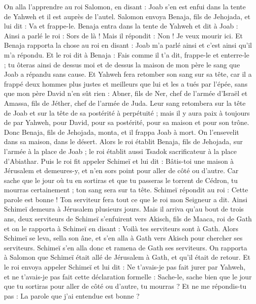 \begin{multicols}{2}
On alla l’apprendre au roi Salomon, en disant : Joab s'en est enfui dans la tente de Yahweh et il est auprès de l'autel. Salomon envoya Benaja, fils de Jehojada, et lui dit : Va et frappe-le.
Benaja entra dans la tente de Yahweh et dit à Joab : Ainsi a parlé le roi : Sors de là ! Mais il répondit : Non ! Je veux mourir ici. Et Benaja rapporta la chose au roi en disant : Joab m'a parlé ainsi et c’est ainsi qu’il m’a répondu.
Et le roi dit à Benaja : Fais comme il t'a dit, frappe-le et enterre-le ; tu ôteras ainsi de dessus moi et de dessus la maison de mon père le sang que Joab a répandu sans cause.
Et Yahweh fera retomber son sang sur sa tête, car il a frappé deux hommes plus justes et meilleurs que lui et les a tués par l'épée, sans que mon père David n’en sût rien : Abner, fils de Ner, chef de l'armée d'Israël et Amassa, fils de Jéther, chef de l'armée de Juda.
Leur sang retombera sur la tête de Joab et sur la tête de sa postérité à perpétuité ; mais il y aura paix à toujours de par Yahweh, pour David, pour sa postérité, pour sa maison et pour son trône.
Donc Benaja, fils de Jehojada, monta, et il frappa Joab à mort. On l'ensevelit dans sa maison, dans le désert.
Alors le roi établit Benaja, fils de Jehojada, sur l'armée à la place de Joab ; le roi établit aussi Tsadok sacrificateur à la place d'Abiathar.
Puis le roi fit appeler Schimeï et lui dit : Bâtis-toi une maison à Jérusalem et demeures-y, et n'en sors point pour aller de côté ou d'autre.
Car sache que le jour où tu en sortiras et que tu passeras le torrent de Cédron, tu mourras certainement ; ton sang sera sur ta tête.
Schimeï répondit au roi : Cette parole est bonne ! Ton serviteur fera tout ce que le roi mon Seigneur a dit. Ainsi Schimeï demeura à Jérusalem plusieurs jours.
Mais il arriva qu'au bout de trois ans, deux serviteurs de Schimeï s'enfuirent vers Akisch, fils de Maaca, roi de Gath et on le rapporta à Schimeï en disant : Voilà tes serviteurs sont à Gath.
Alors Schimeï se leva, sella son âne, et s'en alla à Gath vers Akisch pour chercher ses serviteurs. Schimeï s'en alla donc et ramena de Gath ses serviteurs.
On rapporta à Salomon que Schimeï était allé de Jérusalem à Gath, et qu'il était de retour.
Et le roi envoya appeler Schimeï et lui dit : Ne t'avais-je pas fait jurer par Yahweh, et ne t'avais-je pas fait cette déclaration formelle : Sache-le, sache bien que le jour que tu sortiras pour aller de côté ou d’autre, tu mourras ? Et ne me répondis-tu pas : La parole que j'ai entendue est bonne ?

\end{multicols}
